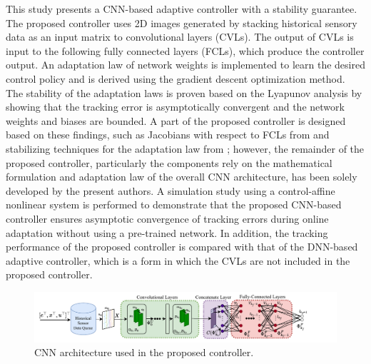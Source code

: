 \documentclass{l4dc2025}
\begin{document}
This study presents a CNN-based adaptive controller with a stability guarantee.
The proposed controller uses 2D images generated by stacking historical sensory data as an input matrix to convolutional layers (CVLs). The output of CVLs is input to the following fully connected layers (FCLs), which produce the controller output. An adaptation law of network weights is implemented to learn the desired control policy and is derived using the gradient descent optimization method. 
The stability of the adaptation laws is proven based on the Lyapunov analysis by showing that the tracking error is asymptotically convergent and the network weights and biases are bounded. 
A part of the proposed controller is designed based on these findings, such as Jacobians with respect to FCLs from \cite{DixonDNN} and stabilizing techniques for the adaptation law from \cite{BoockEKestimation, BookEKcontrol}; however, the remainder of the proposed controller, particularly the components rely on the mathematical formulation and adaptation law of the overall CNN architecture, has been solely developed by the present authors.
A simulation study using a control-affine nonlinear system is performed to demonstrate that the proposed CNN-based controller ensures asymptotic convergence of tracking errors during online adaptation without using a pre-trained network. 
In addition, the tracking performance of the proposed controller is compared with that of the DNN-based adaptive controller, which is a form in which the CVLs are not included in the proposed controller.

\begin{figure}[!t]
    \centering
    \includegraphics[width=1\columnwidth]{imgs/CNNatrl_new.drawio.pdf}
    \caption{CNN architecture used in the proposed controller. 
    } 
    \label{fig: CNN structure}
\end{figure}
\end{document}
